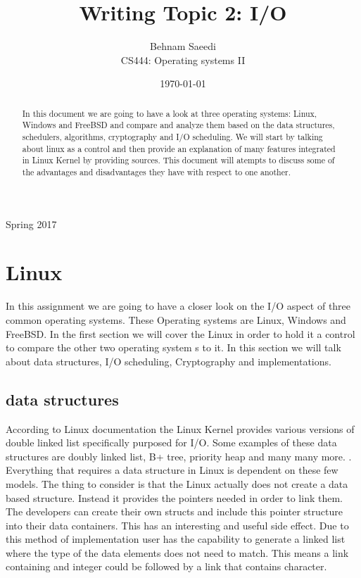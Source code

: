 \documentclass[journal,10pt,onecolumn,compsoc,letterpaper,draftclsnofoot,table,xcdraw]{IEEEtran} \usepackage[margin=0.75in]{geometry}
\title{Writing Topic 2: I/O}
\author{Behnam Saeedi\\ CS444: Operating systems II}
\date{\today}
\begin{document}
\maketitle
\begin{centering}
Spring 2017
\begin{abstract}
\noindent In this document we are going to have a look at three operating systems: Linux, Windows and FreeBSD and compare and analyze them based on the data structures, schedulers, algorithms, cryptography and I/O scheduling. We will start by talking about linux as a control and then provide an explanation of many features integrated in Linux Kernel by providing sources. This document will atempts to discuss some of the advantages and disadvantages they have with respect to one another.
\end{abstract}
\end{centering}
\newpage
\tableofcontents
\newpage
\section{Linux}
\noindent In this assignment we are going to have a closer look on the I/O aspect of three common operating systems. These Operating systems are Linux, Windows and FreeBSD. In the first section we will cover the Linux in order to hold it a control to compare the other two operating system s to it. In this section we will talk about data structures, I/O scheduling, Cryptography and implementations.
\subsection{data structures}
\noindent According to Linux documentation the Linux Kernel provides various versions of double linked list specifically purposed for I/O. Some examples of these data structures are doubly linked list, B+ tree, priority heap and many many more. \cite{1}. Everything that requires a data structure in Linux is dependent on these few models. The thing to consider is that the Linux actually does not create a data based structure. Instead it provides the pointers needed in order to link them. The developers can create their own structs and include this pointer structure into their data containers. This has an interesting and useful side effect. Due to this method of implementation user has the capability to generate a linked list where the type of the data elements does not need to match. This means a link containing and integer could be followed by a link that contains character.
\end{document}
